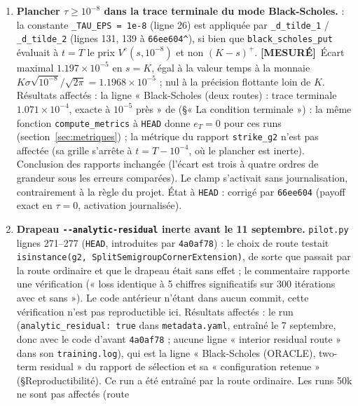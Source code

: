 \documentclass[11pt]{article}
\newcommand{\mesure}{\textbf{[MESURÉ]}}
\newcommand{\code}[1]{\texttt{#1}}
\begin{document}
\begin{enumerate}
\item \textbf{Plancher $\tau\ge10^{-8}$ dans la trace terminale du mode
  Black-Scholes.}  : la
  constante \code{\_TAU\_EPS = 1e-8} (ligne 26) est appliquée par
  \code{\_d\_tilde\_1} / \code{\_d\_tilde\_2} (lignes 131, 139 à
  \code{66ee604\string^}), si bien que \code{black\_scholes\_put} évaluait à
  $t=T$ le prix $V^e(s,10^{-8})$ et non $(K-s)^+$. \mesure\ Écart maximal
  $1.197\times10^{-5}$ en $s=K$, égal à la valeur temps à la monnaie
  $K\sigma\sqrt{10^{-8}}/\sqrt{2\pi}=1.1968\times10^{-5}$ ; nul à la précision
  flottante loin de $K$. Résultats affectés : la ligne « Black-Scholes (deux
  routes) : trace terminale $1.071\times10^{-4}$, exacte à $10^{-5}$ près » de
  (\S« La condition terminale ») : la même fonction \code{compute\_metrics} à
  \code{HEAD} donne $e_T=0$ pour ces runs (section~\ref{sec:metriques}) ; la métrique du rapport \code{strike\_g2}
  n'est pas affectée (sa grille s'arrête à $t=T-10^{-4}$, où le plancher est
  inerte). Conclusion des rapports inchangée (l'écart est trois à quatre
  ordres de grandeur sous les erreurs comparées). Le clamp s'activait sans
  journalisation, contrairement à la règle du projet. État à \code{HEAD} :
  corrigé par \code{66ee604} (payoff exact en $\tau=0$, activation journalisée).
\item \textbf{Drapeau \code{-{}-analytic-residual} inerte avant le
  11 septembre.} \code{pilot.py} lignes 271--277 (\code{HEAD}, introduites par
  \code{4a0af78}) : le choix de route testait
  \code{isinstance(g2, SplitSemigroupCornerExtension)}, de sorte que
   passait par la route ordinaire et que le
  drapeau était sans effet ; le commentaire rapporte une vérification (« loss
  identique à 5 chiffres significatifs sur 300 itérations avec et sans »). Le
  code antérieur n'étant dans aucun commit, cette vérification n'est pas
  reproductible ici. Résultats affectés : le run
  (\code{analytic\_residual: true} dans \code{metadata.yaml}, entraîné le
  7 septembre, donc avec le code d'avant \code{4a0af78} ; aucune ligne
  « interior residual route » dans son \code{training.log}), qui est la ligne
  « Black-Scholes (ORACLE), two-term residual » du rapport de sélection et sa
  « configuration retenue » (\S Reproductibilité). Ce run a été entraîné par
  la route ordinaire. Les runs 50k ne sont pas affectés (route

\end{enumerate}
\end{document}
